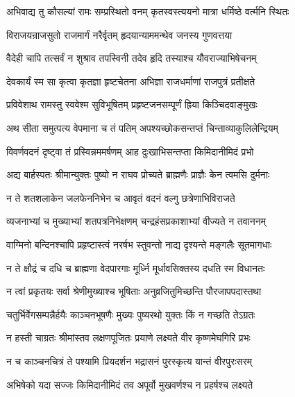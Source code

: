 \twolineshloka
{अभिवाद्य तु कौसल्यां रामः सम्प्रस्थितो वनम्}
{कृतस्वस्त्ययनो मात्रा धर्मिष्ठे वर्त्मनि स्थितः} %

\twolineshloka
{विराजयन्राजसुतो राजमार्गं नरैर्वृतम्}
{हृदयान्याममन्थेव जनस्य गुणवत्तया} %

\twolineshloka
{वैदेही चापि तत्सर्वं न शुश्राव तपस्विनी}
{तदेव हृदि तस्याश्च यौवराज्याभिषेचनम्} %

\twolineshloka
{देवकार्यं स्म सा कृत्वा कृतज्ञा हृष्टचेतना}
{अभिज्ञा राजधर्माणां राजपुत्रं प्रतीक्षते} %

\twolineshloka
{प्रविवेशाथ रामस्तु स्ववेश्म सुविभूषितम्}
{प्रहृष्टजनसम्पूर्णं ह्रिया किञ्चिदवाङ्मुखः} %

\twolineshloka
{अथ सीता समुत्पत्य वेपमाना च तं पतिम्}
{अपश्यच्छोकसन्तप्तं चिन्ताव्याकुलिलेन्द्रियम्} %

\twolineshloka
{विवर्णवदनं दृष्ट्वा तं प्रस्विन्नममर्षणम्}
{आह दुःखाभिसन्तप्ता किमिदानीमिदं प्रभो} %

\twolineshloka
{अद्य बार्हस्पतः श्रीमान्युक्तः पुष्यो न राघव}
{प्रोच्यते ब्राह्मणैः प्राज्ञैः केन त्वमसि दुर्मनाः} %

\twolineshloka
{न ते शतशलाकेन जलफेननिभेन च}
{आवृतं वदनं वल्गु छत्रेणाभिविराजते} %

\twolineshloka
{व्यजनाभ्यां च मुख्याभ्यां शतपत्रनिभेक्षणम्}
{चन्द्रहंसप्रकाशाभ्यां वीज्यते न तवाननम्} %

\twolineshloka
{वाग्मिनो बन्दिनश्चापि प्रहृष्टास्त्वं नरर्षभ}
{स्तुवन्तो नाद्य दृश्यन्ते मङ्गलैः सूतमागधाः} %

\twolineshloka
{न ते क्षौद्रं च दधि च ब्राह्मणा वेदपारगाः}
{मूर्ध्नि मूर्धावसिक्तस्य दधति स्म विधानतः} %

\twolineshloka
{न त्वां प्रकृतयः सर्वा श्रेणीमुख्याश्च भूषिताः}
{अनुव्रजितुमिच्छन्ति पौरजापपदास्तथा} %

\twolineshloka
{चतुर्भिर्वेगसम्पन्नैर्हयैः काञ्चनभूषणैः}
{मुख्यः पुष्यरथो युक्तः किं न गच्छति तेऽग्रतः} %

\twolineshloka
{न हस्ती चाग्रतः श्रीमांस्तव लक्षणपूजितः}
{प्रयाणे लक्ष्यते वीर कृष्णमेघगिरि प्रभः} %

\twolineshloka
{न च काञ्चनचित्रं ते पश्यामि प्रियदर्शन}
{भद्रासनं पुरस्कृत्य यान्तं वीरपुरःसरम्} %

\twolineshloka
{अभिषेको यदा सज्जः किमिदानीमिदं तव}
{अपूर्वो मुखवर्णश्च न प्रहर्षश्च लक्ष्यते} %


